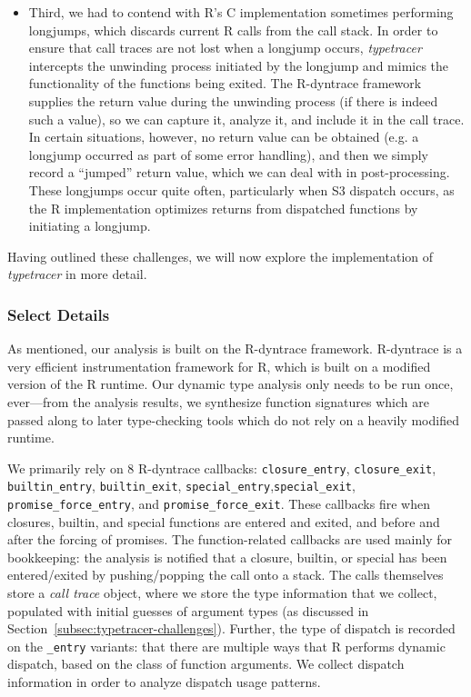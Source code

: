 \documentclass[acmsmall,review,anonymous]{acmart}\settopmatter{printfolios=true,printccs=false,printacmref=false}
\newcommand{\typetracer}{\emph{typetracer}\xspace} %
\begin{document}
\begin{itemize}
\item Third, we had to contend with R's C implementation sometimes performing longjumps, which discards current R calls from the call stack.
In order to ensure that call traces are not lost when a longjump occurs, \typetracer intercepts the unwinding process initiated by the longjump and mimics the functionality of the functions being exited.
The R-dyntrace framework supplies the return value during the unwinding process (if there is indeed such a value), so we can capture it, analyze it, and include it in the call trace.
In certain situations, however, no return value can be obtained (e.g. a longjump occurred as part of some error handling), and then we simply record a ``jumped'' return value, which we can deal with in post-processing.
These longjumps occur quite often, particularly when S3 dispatch occurs, as the R implementation optimizes returns from dispatched functions by initiating a longjump.

\end{itemize}

Having outlined these challenges, we will now explore the implementation of \typetracer in more detail.

%
%
\subsubsection{Select Details}

As mentioned, our analysis is built on the R-dyntrace framework.
R-dyntrace is a very efficient instrumentation framework for R, which is built on a modified version of the R runtime.
Our dynamic type analysis only needs to be run once, ever---from the analysis results, we synthesize function signatures which are passed along to later type-checking tools which do not rely on a heavily modified runtime. 

We primarily rely on 8 R-dyntrace callbacks: \texttt{closure\_entry}, \texttt{closure\_exit}, \texttt{builtin\_entry}, \texttt{builtin\_exit}, \texttt{special\_entry},\texttt{special\_exit}, \texttt{promise\_force\_entry}, and \texttt{promise\_force\_exit}.
These callbacks fire when closures, builtin, and special functions are entered and exited, and before and after the forcing of promises.
The function-related callbacks are used mainly for bookkeeping: the analysis is notified that a closure, builtin, or special has been entered/exited by pushing/popping the call onto a stack.
The calls themselves store a {\it call trace} object, where we store the type information that we collect, populated with initial guesses of argument types (as discussed in Section~\ref{subsec:typetracer-challenges}).
Further, the type of dispatch is recorded on the {\tt \_entry} variants:  that there are multiple ways that R performs dynamic dispatch, based on the class of function arguments.
We collect dispatch information in order to analyze dispatch usage patterns.
\end{document}
